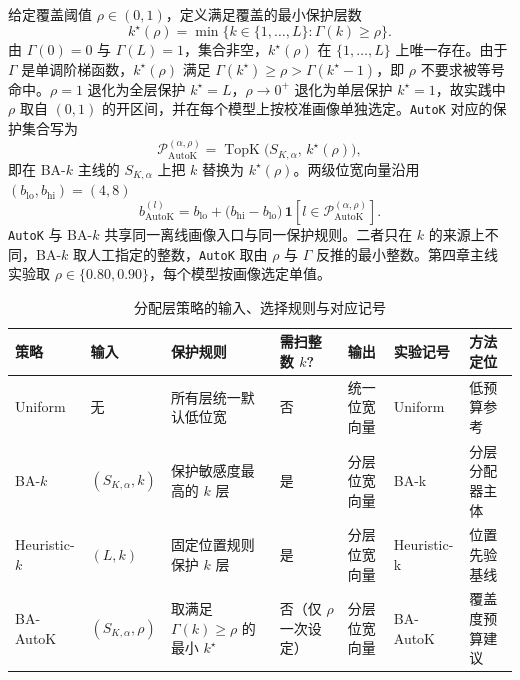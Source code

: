 给定覆盖阈值 $\rho\in(0,1)$，定义满足覆盖的最小保护层数
\begin{equation}
k^\star(\rho)
=
\min\bigl\{k\in\{1,\dots,L\}:\Gamma(k)\ge \rho\bigr\}.
\end{equation}
由 $\Gamma(0)=0$ 与 $\Gamma(L)=1$，集合非空，$k^\star(\rho)$ 在 $\{1,\dots,L\}$ 上唯一存在。由于 $\Gamma$ 是单调阶梯函数，$k^\star(\rho)$ 满足 $\Gamma(k^\star)\ge\rho>\Gamma(k^\star-1)$，即 $\rho$ 不要求被等号命中。$\rho=1$ 退化为全层保护 $k^\star=L$，$\rho\to 0^+$ 退化为单层保护 $k^\star=1$，故实践中 $\rho$ 取自 $(0,1)$ 的开区间，并在每个模型上按校准画像单独选定。\texttt{AutoK} 对应的保护集合写为
\begin{equation}
\mathcal P_{\mathrm{AutoK}}^{(\alpha,\rho)}
=
\operatorname{TopK}\!\bigl(S_{K,\alpha},\,k^\star(\rho)\bigr),
\end{equation}
即在 BA-$k$ 主线的 $S_{K,\alpha}$ 上把 $k$ 替换为 $k^\star(\rho)$。两级位宽向量沿用 $(b_\mathrm{lo}, b_\mathrm{hi})=(4,8)$
\begin{equation}
b_{\mathrm{AutoK}}^{(l)}
=
b_\mathrm{lo}+\bigl(b_\mathrm{hi}-b_\mathrm{lo}\bigr)\,\mathbf 1\!\left[l\in \mathcal P_{\mathrm{AutoK}}^{(\alpha,\rho)}\right].
\end{equation}
\texttt{AutoK} 与 BA-$k$ 共享同一离线画像入口与同一保护规则。二者只在 $k$ 的来源上不同，BA-$k$ 取人工指定的整数，\texttt{AutoK} 取由 $\rho$ 与 $\Gamma$ 反推的最小整数。第四章主线实验取 $\rho\in\{0.80, 0.90\}$，每个模型按画像选定单值。

\begin{table}[!htbp]
  \centering
  \caption{分配层策略的输入、选择规则与对应记号}
  \label{tab:ch3-allocator-policies}
  \footnotesize
  \setlength{\tabcolsep}{3.6pt}
  \renewcommand{\arraystretch}{1.10}
  \begin{tabularx}{\linewidth}{>{\raggedright\arraybackslash}p{1.35cm}>{\raggedright\arraybackslash}p{1.3cm}X>{\centering\arraybackslash}p{1.35cm}>{\raggedright\arraybackslash}p{1.35cm}>{\raggedright\arraybackslash}p{1.55cm}X}
    \toprule
    \textbf{策略} & \textbf{输入} & \textbf{保护规则} & \textbf{需扫整数 $k$?} & \textbf{输出} & \textbf{实验记号} & \textbf{方法定位} \\
    \midrule
    Uniform & 无 & 所有层统一默认低位宽 & 否 & 统一位宽向量 & Uniform & 低预算参考 \\
    BA-$k$ & $(S_{K,\alpha}, k)$ & 保护敏感度最高的 $k$ 层 & 是 & 分层位宽向量 & BA-k & 分层分配器主体 \\
    Heuristic-$k$ & $(L, k)$ & 固定位置规则保护 $k$ 层 & 是 & 分层位宽向量 & Heuristic-k & 位置先验基线 \\
    BA-AutoK & $(S_{K,\alpha}, \rho)$ & 取满足 $\Gamma(k)\ge\rho$ 的最小 $k^\star$ & 否（仅 $\rho$ 一次设定） & 分层位宽向量 & BA-AutoK & 覆盖度预算建议 \\
    \bottomrule
  \end{tabularx}
\end{table}

